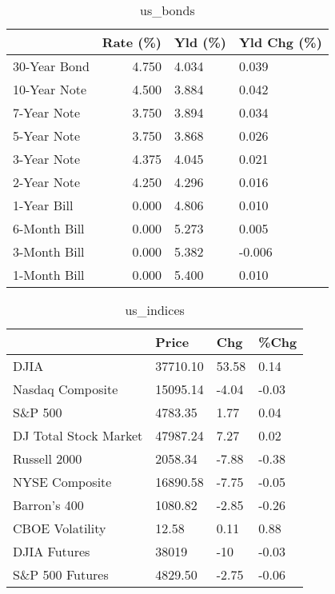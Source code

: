 \documentclass{article}%
\begin{document}
%


\begin{table}[htbp]%
\caption{us\_bonds}%
\centering%
\begin{adjustbox}{width=1\textwidth}%
\begin{tabular}{lrll}
\toprule
             &  Rate (\%) & Yld (\%) & Yld Chg (\%) \\
\midrule
30-Year Bond &     4.750 &   4.034 &       0.039 \\
10-Year Note &     4.500 &   3.884 &       0.042 \\
 7-Year Note &     3.750 &   3.894 &       0.034 \\
 5-Year Note &     3.750 &   3.868 &       0.026 \\
 3-Year Note &     4.375 &   4.045 &       0.021 \\
 2-Year Note &     4.250 &   4.296 &       0.016 \\
 1-Year Bill &     0.000 &   4.806 &       0.010 \\
6-Month Bill &     0.000 &   5.273 &       0.005 \\
3-Month Bill &     0.000 &   5.382 &      -0.006 \\
1-Month Bill &     0.000 &   5.400 &       0.010 \\
\bottomrule
\end{tabular}
%
\end{adjustbox}%
\end{table}

%


\begin{table}[htbp]%
\caption{us\_indices}%
\centering%
\begin{adjustbox}{width=1\textwidth}%
\begin{tabular}{llll}
\toprule
                      &    Price &   Chg &  \%Chg \\
\midrule
                 DJIA & 37710.10 & 53.58 &  0.14 \\
     Nasdaq Composite & 15095.14 & -4.04 & -0.03 \\
              S\&P 500 &  4783.35 &  1.77 &  0.04 \\
DJ Total Stock Market & 47987.24 &  7.27 &  0.02 \\
         Russell 2000 &  2058.34 & -7.88 & -0.38 \\
       NYSE Composite & 16890.58 & -7.75 & -0.05 \\
         Barron's 400 &  1080.82 & -2.85 & -0.26 \\
      CBOE Volatility &    12.58 &  0.11 &  0.88 \\
         DJIA Futures &    38019 &   -10 & -0.03 \\
      S\&P 500 Futures &  4829.50 & -2.75 & -0.06 \\
\bottomrule
\end{tabular}
%
\end{adjustbox}%
\end{table}
\end{document}
